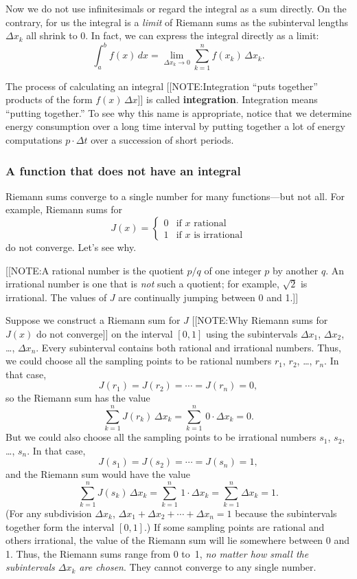 	Now we do not use infinitesimals or regard the integral as a sum directly.  On the contrary, for us the integral is a {\em limit\/} of Riemann sums as the subinterval lengths $\Delta x_k$ all shrink to 0.  In fact, we can express the integral directly as a limit:
	\[
\int_a^b f(x) \, dx = \lim_{\Delta x_k \to 0}
		\sum_{k = 1}^n f(x_k) \, \Delta x_k.
\]

	The process of calculating an integral 
	[[NOTE:Integration  ``puts together'' products of the form $f(x)\,\Delta x$]]
is called {\bf integration}.  Integration means ``putting together.''  To see why this name is appropriate, notice that we determine energy consumption over a long time interval by putting together a lot of energy computations $p \cdot \Delta t$ over a succession of short periods.

\subsubsection{A function that does not have an integral}
\label{subsubsec:a-function-that-does-not-have-an-integral}

	Riemann sums converge to a single number for many functions---but not all.\label{nonintegrable}  For example, Riemann sums for 
	\[
J(x) = \left\{
	\begin{array}{ll}
		0 & \mbox{if $x$ rational} \\
		1 & \mbox{if $x$ is irrational}
	\end{array}
	\right.
\]
do not converge.  Let's see why.  

[[NOTE:A rational number is the quotient $p/q$ of one integer $p$ by
  another $q$.  An irrational number is one that is {\em not\/} such a
  quotient; for example, $\sqrt{2}$ is irrational.  The values of $J$
  are continually jumping between 0 and 1.]]


	Suppose we construct a Riemann sum for $J$ 
	[[NOTE:Why Riemann sums for $J(x)$ do not converge]]
on the interval $[0, 1]$ using the subintervals $\Delta x_1$, $\Delta x_2$, \ldots, $\Delta x_n$.  Every subinterval contains both rational and irrational numbers.  Thus, we could choose all the sampling points to be rational numbers $r_1$, $r_2$, \ldots, $r_n$.  In that case, 
	\[
J(r_1) = J(r_2) = \cdots = J(r_n) = 0,
\]
so the Riemann sum has the value
	\[
\sum_{k = 1}^n J(r_k)\,\Delta x_k =
		\sum_{k = 1}^n \, 0 \cdot \Delta x_k = 0.
\]
But we could also choose all the sampling points to be irrational numbers $s_1$, $s_2$, \ldots, $s_n$.  In that case, 
	\[
J(s_1) = J(s_2) = \cdots = J(s_n) = 1,
\]
and the Riemann sum would have the value
	\[
\sum_{k = 1}^n J(s_k)\,\Delta x_k =
		\sum_{k = 1}^n \, 1 \cdot \Delta x_k = 
		\sum_{k = 1}^n \Delta x_k = 1.
\]
(For any subdivision $\Delta x_k$, $\Delta x_1 + \Delta x_2 + \cdots + \Delta x_n = 1$ because the subintervals together form the interval $[0, 1]$.)  If some sampling points are rational and others irrational, the value of the Riemann sum will lie somewhere between 0 and 1.  Thus, the Riemann sums range from 0 to~1, {\em no matter how small the subintervals\/ $\Delta x_k$ are chosen}.  They cannot converge to any single number.

